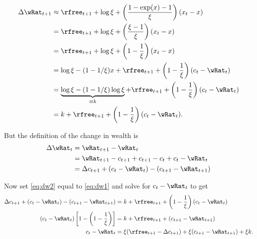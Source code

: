 \documentclass{handout}
\begin{document}
\begin{equation}\begin{gathered}\begin{aligned}
\Delta \wRat_{t+1} & \approx  \rfree_{t+1} + \log \xi +\left(\frac{1-\exp(x)-1}{\xi}\right)(x_{t}-x)
\\ & =         \rfree_{t+1} + \log \xi +\left(\frac{\xi-1}{\xi}\right)(x_{t}-x)
\\ & =         \rfree_{t+1} + \log \xi +\left(1-\frac{1}{\xi}\right)(x_{t}-x)
\\ & =         \log \xi - (1-1/\xi) x + \rfree_{t+1}+\left(1-\frac{1}{\xi}\right)(c_{t}-\wRat_{t})
\\ & =         \underbrace{\log \xi - (1-1/\xi) \log \xi}_{\equiv k} + \rfree_{t+1}+\left(1-\frac{1}{\xi}\right)(c_{t}-\wRat_{t})
\\ & =        k + \rfree_{t+1}+\left(1-\frac{1}{\xi}\right)(c_{t}-\wRat_{t}) \label{eq:dw1}.
\end{aligned}\end{gathered}\end{equation}

But the definition of the change in wealth is 
\begin{equation}\begin{gathered}\begin{aligned}
        \Delta \wRat_{t} & =  \wRat_{t+1}-\wRat_{t}  \\
         & =  \wRat_{t+1}-c_{t+1}+c_{t+1}-c_{t}+c_{t} -\wRat_{t} \\
         & =  \Delta c_{t+1}+(c_{t}-\wRat_{t})-(c_{t+1}-\wRat_{t+1}) \label{eq:dw2}
\end{aligned}\end{gathered}\end{equation}

Now set \eqref{eq:dw2} equal to \eqref{eq:dw1} and solve for 
$c_{t}-\wRat_{t}$ to get
\begin{equation}\begin{gathered}\begin{aligned}
\Delta c_{t+1}+(c_{t}-\wRat_{t})-(c_{t+1}-\wRat_{t+1})   & =    k + \rfree_{t+1}+\left(1-\frac{1}{\xi}\right)(c_{t}-\wRat_{t}) \\
(c_{t}-\wRat_{t})\left[1-\left(1-\frac{1}{\xi}\right)       \right] & =    k + \rfree_{t+1} + (c_{t+1}-\wRat_{t+1}) \\
        c_{t}-\wRat_{t} & =  \xi(\rfree_{t+1}-\Delta c_{t+1}) + \xi (c_{t+1}-\wRat_{t+1}) + \xi k.
\end{aligned}\end{gathered}\end{equation}
\end{document}

